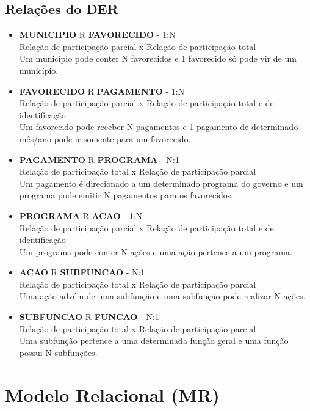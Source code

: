 \documentclass[12pt]{article}
\begin{document}
	\subsection{Relações do DER}
	\label{sec:rel}
	
	\begin{itemize}
		\item \textbf{MUNICIPIO} R \textbf{FAVORECIDO} - 1:N \\ Relação de participação parcial x Relação de participação total \\ Um município pode conter N favorecidos e 1 favorecido só pode vir de um município. 
		\item \textbf{FAVORECIDO} R \textbf{PAGAMENTO} - 1:N \\ Relação de participação parcial x Relação de participação total e de identificação \\ Um favorecido pode receber N pagamentos e 1 pagamento de determinado mês/ano pode ir somente para um favorecido.
		\item \textbf{PAGAMENTO} R \textbf{PROGRAMA} - N:1 \\ Relação de participação total x Relação de participação parcial \\ Um pagamento é direcionado a um determinado programa do governo e um programa pode emitir N pagamentos para os favorecidos.
		\item \textbf{PROGRAMA} R \textbf{ACAO} - 1:N \\ Relação de participação parcial x Relação de participação total e de identificação \\ Um programa pode conter N ações e uma ação pertence a um programa.
		\item \textbf{ACAO} R \textbf{SUBFUNCAO} - N:1 \\ Relação de participação total x Relação de participação parcial \\ Uma ação advém de uma subfunção e uma subfunção pode realizar N ações.
		\item \textbf{SUBFUNCAO} R \textbf{FUNCAO} - N:1 \\ Relação de participação total x Relação de participação parcial \\ Uma subfunção pertence a uma determinada função geral e uma função possui N subfunções.
	\end{itemize}
	
	\section{Modelo Relacional (MR)} 
	\label{sec:mr}
\end{document}

